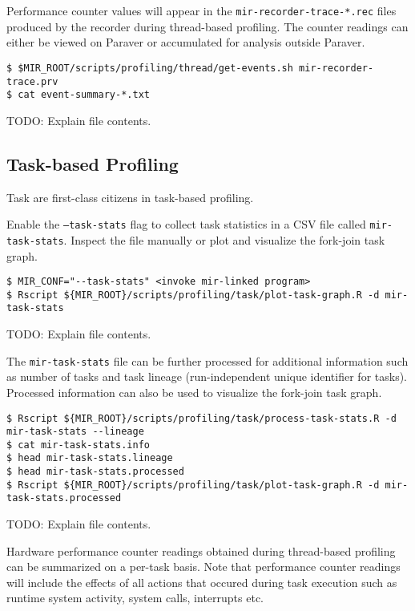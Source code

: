 \documentclass[11pt,a4paper]{article}
\begin{document}
Performance counter values will appear in the \texttt{mir-recorder-trace-*.rec} files produced by the recorder during thread-based profiling. The counter readings can either be viewed on Paraver or accumulated for analysis outside Paraver.

\begin{lstlisting}[style=MyInputStyle]
$ $MIR_ROOT/scripts/profiling/thread/get-events.sh mir-recorder-trace.prv
$ cat event-summary-*.txt
\end{lstlisting}

TODO: Explain file contents.

\subsection{Task-based Profiling}\label{task-based-profiling}

Task are first-class citizens in task-based profiling.

Enable the \texttt{--task-stats} flag to collect task statistics in a CSV file called \texttt{mir-task-stats}. Inspect the file manually or plot and visualize the fork-join task graph.

\begin{lstlisting}[style=MyInputStyle]
$ MIR_CONF="--task-stats" <invoke mir-linked program>
$ Rscript ${MIR_ROOT}/scripts/profiling/task/plot-task-graph.R -d mir-task-stats
\end{lstlisting}

TODO: Explain file contents.

The \texttt{mir-task-stats} file can be further processed for additional information such as number of tasks and task lineage (run-independent unique identifier for tasks). Processed information can also be used to visualize the fork-join task graph.

\begin{lstlisting}[style=MyInputStyle]
$ Rscript ${MIR_ROOT}/scripts/profiling/task/process-task-stats.R -d mir-task-stats --lineage
$ cat mir-task-stats.info
$ head mir-task-stats.lineage
$ head mir-task-stats.processed
$ Rscript ${MIR_ROOT}/scripts/profiling/task/plot-task-graph.R -d mir-task-stats.processed
\end{lstlisting}

TODO: Explain file contents.

Hardware performance counter readings obtained during thread-based profiling can be summarized on a per-task basis. Note that performance counter readings will include the effects of all actions that occured during task execution such as runtime system activity, system calls, interrupts etc.
\end{document}
